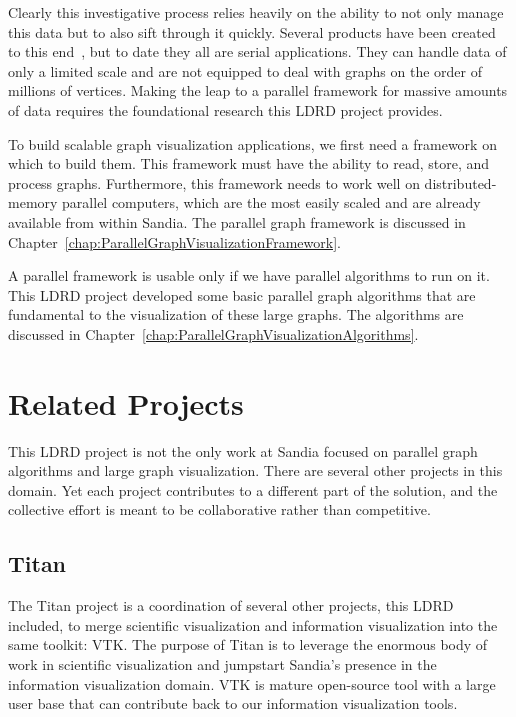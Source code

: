 \documentclass[pdf,12pt,report,strict]{SANDreport}
\newcommand*{\lcite}[1]{~\cite{#1}}
\newcommand{\titan}{Titan\xspace}
\begin{document}
Clearly this investigative process relies heavily on the ability to not
only manage this data but to also sift through it quickly.  Several
products have been created to this end\lcite{Hetzler98,Thomas99,Boyack01},
but to date they all are serial applications.  They can handle data of only
a limited scale and are not equipped to deal with graphs on the order of
millions of vertices.  Making the leap to a parallel framework for massive
amounts of data requires the foundational research this LDRD project
provides.

To build scalable graph visualization applications, we first need a
framework on which to build them.  This framework must have the ability to
read, store, and process graphs.  Furthermore, this framework needs to work
well on distributed-memory parallel computers, which are the most easily
scaled and  are already available from within Sandia.  The parallel graph
framework is discussed in
Chapter~\ref{chap:ParallelGraphVisualizationFramework}.

A parallel framework is usable only if we have parallel algorithms to run
on it.  This LDRD project developed some basic parallel graph algorithms
that are fundamental to the visualization of these large graphs.  The
algorithms are discussed in
Chapter~\ref{chap:ParallelGraphVisualizationAlgorithms}.

\section{Related Projects}
\label{sec:RelatedProjects}

This LDRD project is not the only work at Sandia focused on parallel graph
algorithms and large graph visualization.  There are several other projects
in this domain.  Yet each project contributes to a different part of the
solution, and the collective effort is meant to be collaborative rather
than competitive.

\subsection{\titan}
\label{sec:RelatedProjects:Titan}

\index{Titan@\titan|(}

The \titan project is a coordination of several other projects, this LDRD
included, to merge scientific visualization
and information visualization into the
same toolkit: VTK.  The purpose of \titan is to leverage the
enormous body of work in scientific visualization and jumpstart Sandia's
presence in the information visualization domain.  VTK is mature
open-source tool with a large user base that can contribute back to our
information visualization tools.
\end{document}
